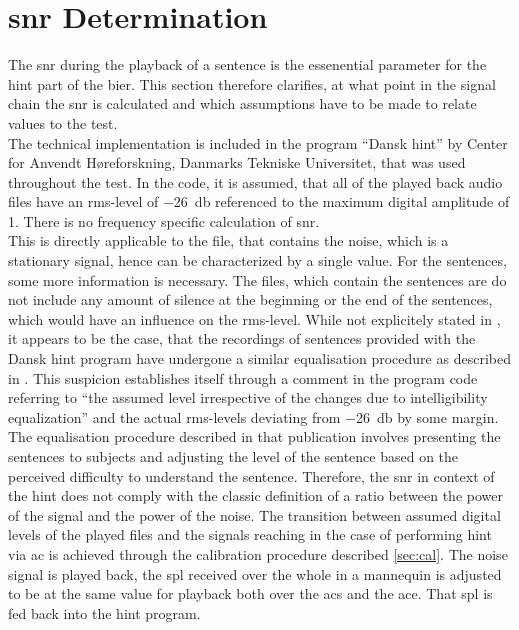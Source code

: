 \section{\gls{snr} Determination}
The \gls{snr} during the playback of a sentence is the essenential parameter for the \gls{hint} part of the \gls{bier}.
This section therefore clarifies, at what point in the signal chain the \gls{snr} is calculated and which assumptions have to be made to relate values to the test.\\
The technical implementation is included in the \matlab program \enquote{Dansk \gls{hint}} by Center for Anvendt Høreforskning, Danmarks Tekniske Universitet, that was used throughout the test.
In the code, it is assumed, that all of the played back audio files have an \gls{rms}-level of \SI{-26}{\decibel} referenced to the maximum digital amplitude of 1. There is no frequency specific calculation of \gls{snr}.\\
This is directly applicable to the file, that contains the noise, which is a stationary signal, hence can be characterized by a single value.
For the sentences, some more information is necessary. The files, which contain the sentences are do not include any amount of silence at the beginning or the end of the sentences, which would have an influence on the \gls{rms}-level.
While not explicitely stated in \citep{hint_2011}, it appears to be the case, that the recordings of sentences provided with the Dansk \gls{hint} program have undergone a similar equalisation procedure as described in \citep{nielsen_dau_09}. 
This suspicion establishes itself through a comment in the program code referring to \enquote{the assumed level irrespective of the changes due to intelligibility equalization} and the actual \gls{rms}-levels deviating from \SI{-26}{\decibel} by some margin.
The equalisation procedure described in that publication involves presenting the sentences to subjects and adjusting the level of the sentence based on the perceived difficulty to understand the sentence.
Therefore, the \gls{snr} in context of the \gls{hint} does not comply with the classic definition of a ratio between the power of the signal and the power of the noise.
The transition between assumed digital levels of the played files and the signals reaching in the case of performing \gls{hint} via \gls{ac} is achieved through the calibration procedure described \autoref{sec:cal}. The noise signal is played back, the \gls{spl} received over the whole in a mannequin is adjusted  to be at the same value for playback both over the \gls{acs} and the \gls{ace}. That \gls{spl} is fed back into the \gls{hint} \matlab program.
